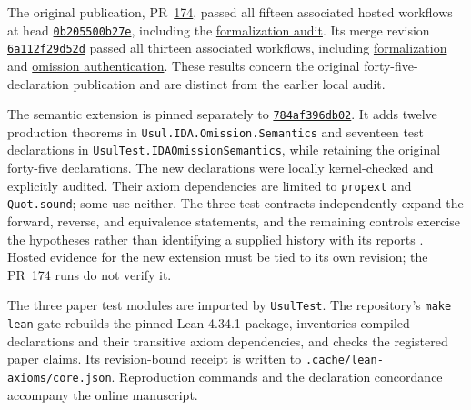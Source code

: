 \documentclass[11pt]{article}
\newcommand{\run}[2]{\href{https://github.com/larsbx/usul-al-fiqh-deontic-circuits/actions/runs/#1}{#2}}
\begin{document}
The original publication, PR~\href{https://github.com/larsbx/usul-al-fiqh-deontic-circuits/pull/174}{174}, passed all fifteen associated hosted workflows at head
\href{https://github.com/larsbx/usul-al-fiqh-deontic-circuits/commit/0b205500b27ebc164b3050bb35d3d20b3893d45c}{\texttt{0b205500b27e}}, including the \run{43707539191}{formalization audit}. Its merge revision
\href{https://github.com/larsbx/usul-al-fiqh-deontic-circuits/commit/6a112f29d52d08e3db9c3b8e92625603ee24682a}{\texttt{6a112f29d52d}} passed all thirteen associated workflows, including \run{43707899458}{formalization} and \run{43707899506}{omission authentication}. These results concern the original forty-five-declaration publication and are distinct from the earlier local audit.

The semantic extension is pinned separately to
\href{https://github.com/larsbx/usul-al-fiqh-deontic-circuits/commit/784af396db0241c8c83da096d060740c93f4ff1d}{\texttt{784af396db02}}. It adds twelve production theorems in \texttt{Usul.\allowbreak{}IDA.\allowbreak{}Omission.\allowbreak{}Semantics} and seventeen test declarations in \texttt{UsulTest.\allowbreak{}IDAOmissionSemantics}, while retaining the original forty-five declarations. The new declarations were locally kernel-checked and explicitly audited. Their axiom dependencies are limited to \texttt{propext} and \texttt{Quot.sound}; some use neither. The three test contracts independently expand the forward, reverse, and equivalence statements, and the remaining controls exercise the hypotheses rather than identifying a supplied history with its reports \cite{omission-semantics}. Hosted evidence for the new extension must be tied to its own revision; the PR~174 runs do not verify it.

The three paper test modules are imported by \texttt{UsulTest}. The repository's \texttt{make lean} gate rebuilds the pinned Lean 4.34.1 package, inventories compiled declarations and their transitive axiom dependencies, and checks the registered paper claims. Its revision-bound receipt is written to \texttt{.\allowbreak{}cache/\allowbreak{}lean-axioms/\allowbreak{}core.\allowbreak{}json}. Reproduction commands and the declaration concordance accompany the online manuscript.
\end{document}
